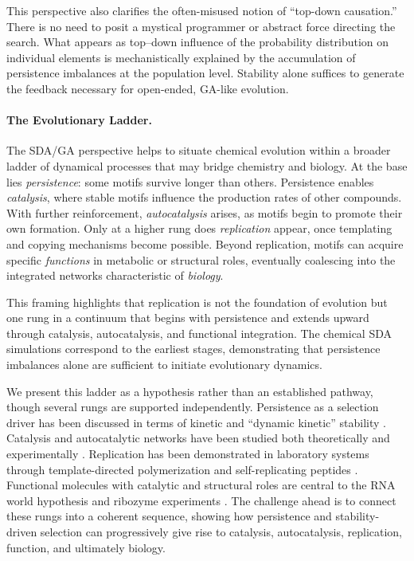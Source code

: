 \documentclass[life,article,submit,pdftex,moreauthors]{Definitions/mdpi}
\begin{document}
This perspective also clarifies the often-misused notion of “top-down causation.” There is no need to posit a mystical programmer or abstract force directing the search. What appears as top–down influence of the probability distribution on individual elements is mechanistically explained by the accumulation of persistence imbalances at the population level. Stability alone suffices to generate the feedback necessary for open-ended, GA-like evolution.

\paragraph{The Evolutionary Ladder.}  
The SDA/GA perspective helps to situate chemical evolution within a broader ladder of dynamical processes that may bridge chemistry and biology. At the base lies \textit{persistence}: some motifs survive longer than others. Persistence enables \textit{catalysis}, where stable motifs influence the production rates of other compounds. With further reinforcement, \textit{autocatalysis} arises, as motifs begin to promote their own formation. Only at a higher rung does \textit{replication} appear, once templating and copying mechanisms become possible. Beyond replication, motifs can acquire specific \textit{functions} in metabolic or structural roles, eventually coalescing into the integrated networks characteristic of \textit{biology}.  

This framing highlights that replication is not the foundation of evolution but one rung in a continuum that begins with persistence and extends upward through catalysis, autocatalysis, and functional integration. The chemical SDA simulations correspond to the earliest stages, demonstrating that persistence imbalances alone are sufficient to initiate evolutionary dynamics.  

We present this ladder as a hypothesis rather than an established pathway, though several rungs are supported independently. Persistence as a selection driver has been discussed in terms of kinetic and “dynamic kinetic” stability \cite{pross2012origins}. Catalysis and autocatalytic networks have been studied both theoretically and experimentally \cite{kauffman1993origins, hordijk2012autocatalytic, ashkenasy2017design}. Replication has been demonstrated in laboratory systems through template-directed polymerization and self-replicating peptides \cite{lincoln2009self, ashkenasy2004autocatalytic}. Functional molecules with catalytic and structural roles are central to the RNA world hypothesis and ribozyme experiments \cite{kruger1982self, copley2007primordial}. The challenge ahead is to connect these rungs into a coherent sequence, showing how persistence and stability-driven selection can progressively give rise to catalysis, autocatalysis, replication, function, and ultimately biology.
\end{document}
